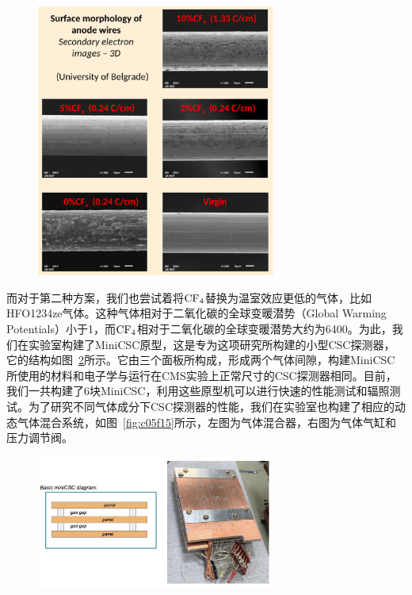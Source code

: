 \begin{figure}[!htbp]
    \centering
    \includegraphics[width=0.7\textwidth]{figures/chapter05/CSC_deposit.png}
    \label{fig:c05f13}
\end{figure}

而对于第二种方案，我们也尝试着将$\mathrm{CF_4}$替换为温室效应更低的气体，比如HFO1234ze气体。这种气体相对于二氧化碳的全球变暖潜势（Global Warming Potentials）小于1，而$\mathrm{CF_4}$相对于二氧化碳的全球变暖潜势大约为6400。为此，我们在实验室构建了MiniCSC原型，这是专为这项研究所构建的小型CSC探测器，它的结构如图~\ref{fig:c05f14}所示。它由三个面板所构成，形成两个气体间隙，构建MiniCSC所使用的材料和电子学与运行在CMS实验上正常尺寸的CSC探测器相同。目前，我们一共构建了6块MiniCSC，利用这些原型机可以进行快速的性能测试和辐照测试。为了研究不同气体成分下CSC探测器的性能，我们在实验室也构建了相应的动态气体混合系统，如图~\ref{fig:c05f15}所示，左图为气体混合器，右图为气体气缸和压力调节阀。

\begin{figure}[!htbp]
    \centering
    \includegraphics[width=0.7\textwidth]{figures/chapter05/MiniCSC.jpg}
    \label{fig:c05f14}
\end{figure}

